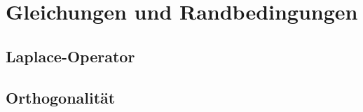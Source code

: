 %
%
%
\section{Gleichungen und Randbedingungen
\label{buch:pde:section:gleichungen-und-randbedingungen}}

\subsection{Laplace-Operator}

\subsection{Orthogonalität}
